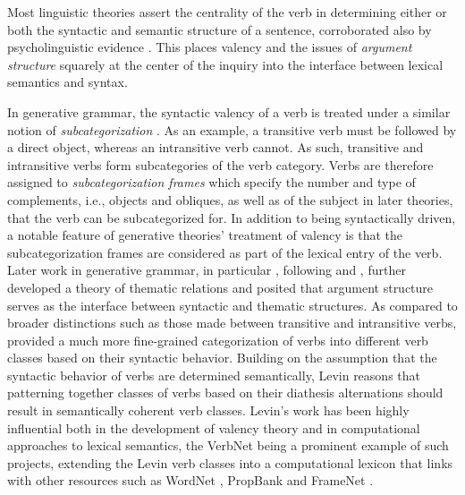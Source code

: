 Most linguistic theories assert the centrality of the verb in determining either or both the syntactic and semantic structure of a sentence, corroborated also by psycholinguistic evidence \citep{healy1970}. This places valency and the issues of \textit{argument structure} squarely at the center of the inquiry into the interface between lexical semantics and syntax.

In generative grammar, the syntactic valency of a verb is treated under a similar notion of \textit{subcategorization} \citep{chomsky1965a}. As an example, a transitive verb must be followed by a direct object, whereas an intransitive verb cannot. As such, transitive and intransitive verbs form subcategories of the verb category. Verbs are therefore assigned to \textit{subcategorization frames} which specify the number and type of complements, i.e., objects and obliques, as well as of the subject in later theories, that the verb can be subcategorized for. In addition to being syntactically driven, a notable feature of generative theories' treatment of valency is that the subcategorization frames are considered as part of the lexical entry of the verb. Later work in generative grammar, in particular \citet{jackendoff1972,jackendoff1987,jackendoff1992}, following \citet{katz1963} and \citet{gruber1962}, further developed a theory of thematic relations and posited that argument structure serves as the interface between syntactic and thematic structures.
As compared to broader distinctions such as those made between transitive and intransitive verbs, \citet{levin1993} provided a much more fine-grained categorization of verbs into different verb classes based on their syntactic behavior. Building on the assumption that the syntactic behavior of verbs are determined semantically, Levin reasons that patterning together classes of verbs based on their diathesis alternations should result in semantically coherent verb classes. Levin's work has been highly influential both in the development of valency theory and in computational approaches to lexical semantics, the VerbNet \citep{kipper-schuler2005, kipper2006, kipper2008} being a prominent example of such projects, extending the Levin verb classes into a computational lexicon that links with other resources such as WordNet \citep{fellbaum1998, miller1995}, PropBank \citep{kingsbury2002} and FrameNet \citep{baker1998, fillmore2015}.

